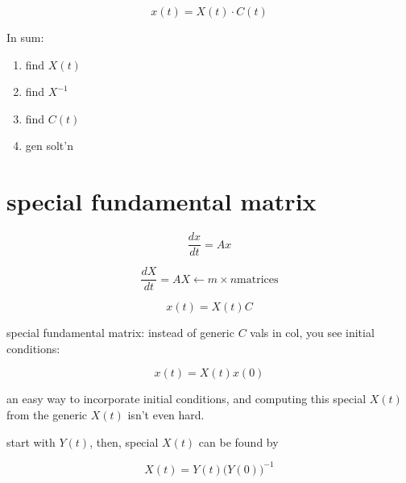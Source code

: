\documentclass[twocolumn,draft]{article}
\begin{document}
 \[
 	x(t) = X(t)\cdot C(t)
 \]
 
 In sum:
 
 \begin{enumerate}
 	\item find $X(t)$
	\item find $X^{-1}$
	\item find $C(t)$
	\item gen solt'n
 \end{enumerate}
 
 \newpage
 
 \section*{special fundamental matrix}
 
 \[
 	\frac{dx}{dt} = Ax
 \]
 
 \[
 	\frac{dX}{dt} = AX \leftarrow m\times n\text{matrices}
 \]
 
 \[
 	x(t) = X(t)C
 \]
 
 special fundamental matrix: instead of generic $C$ vals in col, you see initial conditions:
 
 \[
 	x(t) = X(t) x(0)
 \]
 
 an easy way to incorporate initial conditions, and computing this special $X(t)$ from the
 generic $X(t)$ isn't even hard.
 
 start with $Y(t)$, then, special $X(t)$ can be found by
 
 \[
 	X(t) = Y(t)\Big(Y(0)\Big)^{-1}
 \]
 
\end{document}
